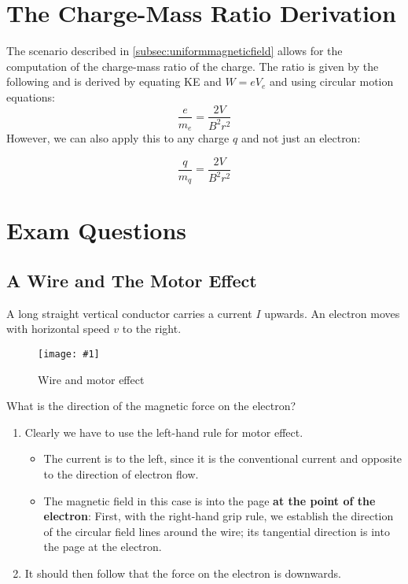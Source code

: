 \documentclass[a4paper,12pt]{article}
\let\oldsection\section
\renewcommand\section{\clearpage\oldsection}
\newcommand{\img}[4]{\begin{center}
  \begin{figure}[H]
    \centering
    \texttt{[image: \#1]}
    \caption{#3}
    \label{fig:#4}
  \end{figure}
\end{center}}
\begin{document}
\section{The Charge-Mass Ratio Derivation}
The scenario described in \cref{subsec:uniformmagneticfield} allows for the computation of the charge-mass ratio of the charge. The ratio is given by the following and is derived by equating KE and $W = eV_e$ and using circular motion equations:
\begin{equation}
  \frac{e}{m_e} = \frac{2V}{B^2r^2}
\end{equation}
However, we can also apply this to any charge $q$ and not just an electron:

\begin{equation}
  \frac{q}{m_q} = \frac{2V}{B^2r^2}
\end{equation}

\pagebreak

\section{Exam Questions}

\subsection{A Wire and The Motor Effect}

A long straight vertical conductor carries a current $I$ upwards. An electron moves with horizontal speed $v$ to the right.

\img{ex/wiremotor.png}{0.25}{Wire and motor effect}{wiremotor}

What is the direction of the magnetic force on the electron?
\begin{enumerate}
  \item Clearly we have to use the left-hand rule for motor effect.
        \begin{itemize}
          \item The current is to the left, since it is the conventional current and opposite to the direction of electron flow.
          \item The magnetic field in this case is into the page \textbf{at the point of the electron}: First, with the right-hand grip rule, we establish the direction of the circular field lines around the wire; its tangential direction is into the page at the electron.
        \end{itemize}
  \item It should then follow that the force on the electron is downwards.
\end{enumerate}
\end{document}
